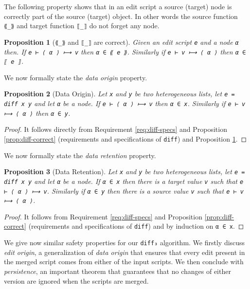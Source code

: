 \documentclass{sigplanconf}
\theoremstyle{plain}
\newtheorem{prop}{Proposition}
\begin{document}
The following property shows that in an edit script a source (target)
node is correctly part of the source (target) object.
%
In other words the source function \texttt{⟪\_⟫} and target function
\texttt{⟦\_⟧} do not forget any node.
\begin{prop}[\texttt{⟪\_⟫} and \texttt{⟦\_⟧} are correct]
\label{prop:source-target-cmp}
Given an edit script \texttt{e} and a node \texttt{α} then.
If \texttt{e ⊢ ⟨ α ⟩ ⟼ v} then \texttt{α ∈ ⟪ e ⟫}.
Similarly if \texttt{e ⊢ v ⟼ ⟨ α ⟩} then \texttt{α ∈ ⟦ e ⟧}.
\end{prop}

We now formally state the \emph{data origin} property.
\begin{prop}[Data Origin]
Let \texttt{x} and \texttt{y} be two heterogeneous lists, let \texttt{e = diff x y}
and let \texttt{α} be a node.
If \texttt{e ⊢ ⟨ α ⟩ ⟼ v} then \texttt{α ∈ x}. Similarly if \texttt{e ⊢ v ⟼ ⟨ α ⟩}
then \texttt{α ∈ y}.
\end{prop}    
\begin{proof}
  It follows directly from Requirement \ref{req:diff-specs} and Proposition
  \ref{prop:diff-correct} (requirements and specifications of
  \texttt{diff}) and Proposition \ref{prop:source-target-cmp}.
\end{proof}

We now formally state the \emph{data retention} property.
\begin{prop}[Data Retention]
\label{prop:data-retention}
  Let \texttt{x} and \texttt{y} be two heterogeneous lists, let
  \texttt{e = diff x y} and let \texttt{α} be a node.
%
  If \texttt{α ∈ x} then there is a target value \texttt{v} such that
  \texttt{e ⊢ ⟨ α ⟩ ⟼ v}.
%
  Similarly if \texttt{α ∈ y} then there is a source value \texttt{v} such that
  \texttt{e ⊢ v ⟼ ⟨ α ⟩}.
\end{prop}
\begin{proof}
  It follows from Requirement \ref{req:diff-specs} and Proposition
  \ref{prop:diff-correct} (requirements and specifications of
  \texttt{diff}) and by induction on \texttt{α ∈ x}.
\end{proof}
 
  We give now similar safety properties for our \texttt{diff₃} algorithm.
  We firstly discuss \emph{edit origin}, a generalization of \emph{data origin}
  that ensures that every edit present in the merged script comes from either 
  of the input scripts. We then conclude with  \emph{persistence}, an important 
  theorem that guarantees that no changes of either version are ignored when
  the scripts are merged.
\end{document}
